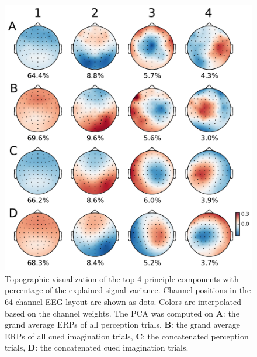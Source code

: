 \begin{figure}[t] 
  \begin{center}
    \includegraphics[scale=0.5]{Figures/principle_components.pdf}
    \caption{%
Topographic visualization of the top 4 principle components with percentage of the explained signal variance. %
Channel positions in the 64-channel EEG layout are shown as dots.
Colors are interpolated based on the channel weights.
The PCA was computed on
\textbf{A}: the grand average \acp{ERP} of all perception trials,
\textbf{B}: the grand average \acp{ERP} of all cued imagination trials,
\textbf{C}: the concatenated perception trials,
\textbf{D}: the concatenated cued imagination trials.
}
    \label{fig:components}
  \end{center}
\end{figure}

